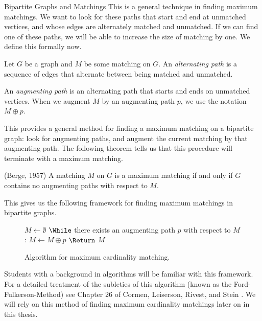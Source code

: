 \begin{section}{Bipartite Graphs and Matchings}
	This is a general technique in 
	finding maximum matchings. We want to look for these paths that start and end at unmatched 
	vertices, and whose edges are alternately matched and unmatched. If we can find one of these 
	paths, we will be able to increase the size of matching by one. We define this formally now.
	\begin{definition}
		Let $G$ be a graph and $M$ be some matching on $G$. An \emph{alternating path} is a 
		sequence of edges that alternate between being matched and unmatched.
	\end{definition}
	\begin{definition}
		An \emph{augmenting path} is an alternating path that starts and ends on unmatched 
		vertices. When we augment $M$ by an augmenting path $p$, we use the notation 
		$M\oplus p$.
	\end{definition}
	This provides a general method for finding a maximum matching on a bipartite graph: 
	look for augmenting paths, and augment the current matching by that augmenting 
	path. The following theorem tells us that this procedure will terminate with a maximum 
	matching.
	\begin{theorem}{(Berge, 1957)}
		A matching $M$ on $G$ is a maximum matching if and only if $G$ contains no augmenting 
		paths with respect to $M$.
	\end{theorem}
	This gives us the following framework for finding maximum matchings in bipartite graphs.
	\begin{figure}
	\begin{center}
		\begin{minipage}{3in}
		\begin{codebox}
			\li $M \gets \emptyset $
			\li $\While$ there exists an augmenting path $p$ with respect to $M$:
				\Do
			\li		$M \gets M\oplus p$
				\End
			\li $\Return$ $M$
		\end{codebox}
		\end{minipage}
	\end{center}
		\caption{Algorithm for maximum cardinality matching.}
	\end{figure}
	Students with a background in algorithms will be familiar with this framework. For a detailed 
	treatment of the subleties of this algorithm (known as the Ford-Fulkerson-Method) see Chapter 
	26 of Cormen, Leiserson, Rivest, and Stein \cite{cormen2009introduction}. We will rely on 
	this method of finding maximum cardinality matchings later on in this thesis.
\end{section}

